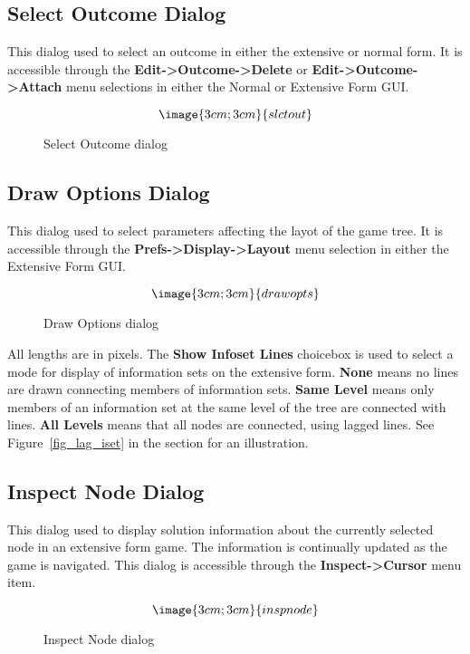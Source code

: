 \subsection{Select Outcome Dialog}\label{SelectOutcome}

This dialog used to select an outcome in either the extensive or
normal form. It is accessible through the {\bf Edit->Outcome->Delete} or 
{\bf Edit->Outcome->Attach} menu selections in either the Normal or
Extensive Form GUI. 

\begin{figure}
$$\image{3cm;3cm}{slctout}$$
\caption{Select Outcome dialog}\label{fig_selectout}
\end{figure}

\subsection{Draw Options Dialog}\label{DrawOptions}

This dialog used to select parameters affecting the layot of the game
tree.  It is accessible through the {\bf Prefs->Display->Layout} menu
selection in either the Extensive Form GUI.

\begin{figure}
$$\image{3cm;3cm}{drawopts}$$
\caption{Draw Options dialog}\label{fig_drawopts}
\end{figure}

All lengths are in pixels.  The {\bf Show Infoset Lines} choicebox is used
to select a mode for display of information sets on the extensive
form.  {\bf None} means no lines are drawn connecting members of
information sets.  {\bf Same Level} means only members of an
information set at the same level of the tree are connected with
lines.  {\bf All Levels} means that all nodes are connected, using
lagged lines.  See Figure~\ref{fig_lag_iset} in the  section for an illustration.

\subsection{Inspect Node Dialog}\label{InspectNode}

This dialog used to display solution information about the currently
selected node in an extensive form game.  The information is
continually updated as the game is navigated.  This dialog is
accessible through the {\bf Inspect->Cursor} menu item.  

\begin{figure}
$$\image{3cm;3cm}{inspnode}$$
\caption{Inspect Node dialog}\label{fig_inspectnode}
\end{figure}


